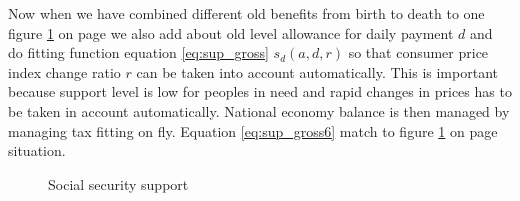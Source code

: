 Now when we have combined different old benefits from birth to death to one
figure \ref{fig:Support} on page \pageref{fig:Support} we also add about old
level allowance for daily payment $d$ and do fitting function equation 
\ref{eq:sup_gross} $s_d(a,d,r)$ so that consumer price index change ratio $r$
can be taken into account automatically. This is important because support
level is low for peoples in need and rapid changes in prices has to be taken
in account automatically. National economy balance is then managed by managing
tax fitting on fly. Equation \ref{eq:sup_gross6} match to figure
\ref{fig:Support}
on page \pageref{fig:Support} situation.
\begin{figure} %
 \begin{center}
  \caption{Social security support}
  \label{fig:Support} 
 \end{center}
\end{figure}

